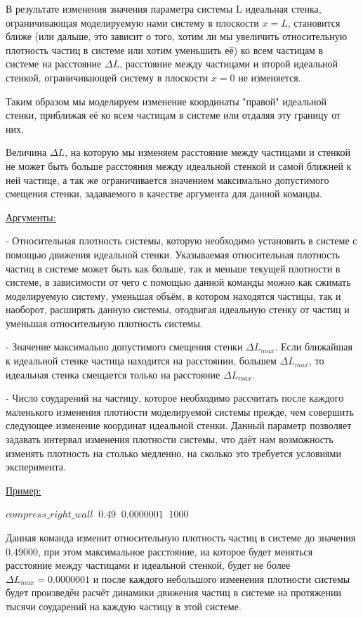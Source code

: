 \documentclass{article}
\begin{document}
В результате изменения значения параметра системы L идеальная стенка, ограничивающая моделируемую нами систему в плоскости $ x = L $, становится ближе (или дальше, это зависит о того, хотим ли мы увеличить относительную плотность частиц в системе или хотим уменьшить её) ко всем частицам в системе на расстояние $ \Delta L $, расстояние между частицами и второй идеальной стенкой, ограничивающей систему в плоскости $ x = 0 $ не изменяется.

Таким образом мы моделируем изменение координаты "правой" идеальной стенки, приближая её ко всем частицам в системе или отдаляя эту границу от них.

Величина $ \Delta L $, на которую мы изменяем расстояние между частицами и стенкой не может быть больше расстояния между идеальной стенкой и самой ближней к ней частице, а так же ограничивается значением максимально допустимого смещения стенки, задаваемого в качестве аргумента для данной команды.

\uline{Аргументы:}

- Относительная плотность системы, которую необходимо установить в системе с помощью движения идеальной стенки. Указываемая относительная плотность частиц в системе может быть как больше, так и меньше текущей плотности в системе, в зависимости от чего с помощью данной команды можно как сжимать моделируемую систему, уменьшая объём, в котором находятся частицы, так и наоборот, расширять данную системы, отодвигая идеальную стенку от частиц и уменьшая относительную плотность системы.

- Значение максимально допустимого смещения стенки $ \Delta L_{max} $. Если ближайшая к идеальной стенке частица находится на расстоянии, большем $ \Delta L_{max} $, то идеальная стенка смещается только на расстояние $ \Delta L_{max} $.

- Число соударений на частицу, которое необходимо рассчитать после каждого маленького изменения плотности моделируемой системы прежде, чем совершить следующее изменение координат идеальной стенки. Данный параметр позволяет задавать интервал изменения плотности системы, что даёт нам возможность изменять плотность на столько медленно, на сколько  это требуется условиями эксперимента.

\uline{Пример:}

$ compress\_right\_wall \;\; 0.49 \;\; 0.0000001 \;\; 1000 $

Данная команда изменит относительную плотность частиц в системе до значения $ 0.49000 $, при этом максимальное расстояние, на которое будет меняться расстояние между частицами и идеальной стенкой, будет не более $ \Delta L_{max} = 0.0000001 $ и после каждого небольшого изменения плотности системы будет произведён расчёт динамики движения частиц в системе на протяжении тысячи соударений на каждую частицу в этой системе.
\end{document}
